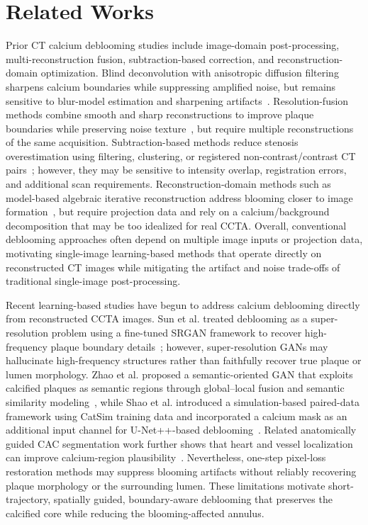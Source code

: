 \documentclass[singleLetter,times]{sagej}
\begin{document}
\section{Related Works}
Prior CT calcium deblooming studies include image-domain post-processing, multi-reconstruction fusion, subtraction-based correction, and reconstruction-domain optimization. Blind deconvolution with anisotropic diffusion filtering sharpens calcium boundaries while suppressing amplified noise, but remains sensitive to blur-model estimation and sharpening artifacts~\cite{spie_conv}. Resolution-fusion methods combine smooth and sharp reconstructions to improve plaque boundaries while preserving noise texture~\cite{smooth_sharp}, but require multiple reconstructions of the same acquisition. Subtraction-based methods reduce stenosis overestimation using filtering, clustering, or registered non-contrast/contrast CT pairs~\cite{pp_subtraction,wall_calc}; however, they may be sensitive to intensity overlap, registration errors, and additional scan requirements. Reconstruction-domain methods such as model-based algebraic iterative reconstruction address blooming closer to image formation~\cite{mbai}, but require projection data and rely on a calcium/background decomposition that may be too idealized for real CCTA. Overall, conventional deblooming approaches often depend on multiple image inputs or projection data, motivating single-image learning-based methods that operate directly on reconstructed CT images while mitigating the artifact and noise trade-offs of traditional single-image post-processing.

Recent learning-based studies have begun to address calcium deblooming directly from reconstructed CCTA images. Sun et al. treated deblooming as a super-resolution problem using a fine-tuned SRGAN framework to recover high-frequency plaque boundary details~\cite{sun_ng_2022}; however, super-resolution GANs may hallucinate high-frequency structures rather than faithfully recover true plaque or lumen morphology. Zhao et al. proposed a semantic-oriented GAN that exploits calcified plaques as semantic regions through global--local fusion and semantic similarity modeling~\cite{ZHAO_sem}, while Shao et al. introduced a simulation-based paired-data framework using CatSim training data and incorporated a calcium mask as an additional input channel for U-Net++-based deblooming~\cite{shao2026deblooming}. Related anatomically guided CAC segmentation work further shows that heart and vessel localization can improve calcium-region plausibility~\cite{bioengineering12111243casc_seg}. Nevertheless, one-step pixel-loss restoration methods may suppress blooming artifacts without reliably recovering plaque morphology or the surrounding lumen. These limitations motivate short-trajectory, spatially guided, boundary-aware deblooming that preserves the calcified core while reducing the blooming-affected annulus.
\end{document}
